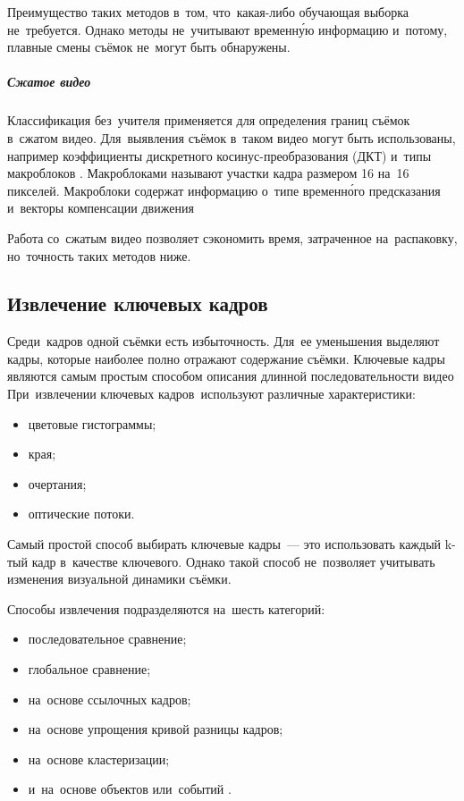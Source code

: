Преимущество таких методов в~том, что~какая-либо
обучающая выборка не~требуется.
Однако методы не~учитывают временну́ю информацию
и~потому, плавные смены съёмок не~могут быть обнаружены.


\subparagraph{Сжатое видео}

Классификация без~учителя применяется для
определения границ съёмок в~сжатом видео.
Для~выявления съёмок в~таком видео могут быть использованы,
например коэффициенты дискретного косинус-преобразования
(ДКТ) и~типы макроблоков
\cite{Zhao:2006} \cite{Bruyne:2008} \cite{Koumaras:2006}.
Макроблоками называют участки кадра размером 16 на~16
пикселей. Макроблоки содержат информацию о~типе временно́го
предсказания и~векторы компенсации движения \cite{Gall:1991}

Работа со~сжатым видео позволяет сэкономить
время, затраченное на~распаковку,
но~точность таких методов ниже.


\subsection{Извлечение ключевых кадров}

Среди~кадров одной съёмки есть избыточность.
Для~ее уменьшения выделяют кадры,
которые наиболее полно отражают содержание съёмки.
Ключевые кадры являются самым простым способом описания
длинной последовательности видео
При~извлечении ключевых кадров\
используют различные характеристики:
\begin{itemize}
    \item цветовые гистограммы;
    \item края;
    \item очертания;
    \item оптические потоки.
\end{itemize}

Самый простой способ выбирать ключевые кадры~— это использовать каждый
k-тый кадр в~качестве ключевого. Однако такой способ не~позволяет
учитывать изменения визуальной динамики съёмки.

Способы извлечения подразделяются на~шесть категорий:
\begin{itemize}
    \item последовательное сравнение;
    \item глобальное сравнение;
    \item на~основе ссылочных кадров;
    \item на~основе упрощения кривой разницы кадров;
    \item на~основе кластеризации;
    \item и~на~основе объектов или~событий \cite{Truong:2007}.
\end{itemize}


